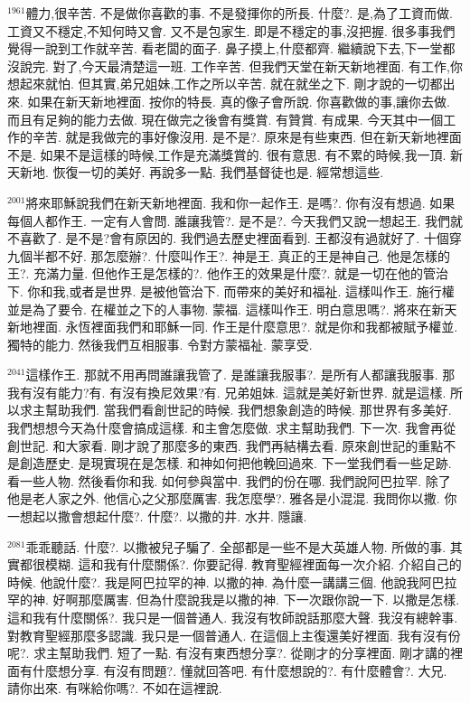 \documentclass{book}
\begin{document}
$^{1961}$體力,很辛苦.
不是做你喜歡的事.
不是發揮你的所長.
什麼?.
是,為了工資而做.
工資又不穩定,不知何時又會.
又不是包家生.
即是不穩定的事,沒把握.
很多事我們覺得一說到工作就辛苦.
看老闆的面子.
鼻子摸上,什麼都齊.
繼續說下去,下一堂都沒說完.
對了,今天最清楚這一班.
工作辛苦.
但我們天堂在新天新地裡面.
有工作,你想起來就怕.
但其實,弟兄姐妹,工作之所以辛苦.
就在就坐之下.
剛才說的一切都出來.
如果在新天新地裡面.
按你的特長.
真的像子會所說.
你喜歡做的事,讓你去做.
而且有足夠的能力去做.
現在做完之後會有獎賞.
有贊賞.
有成果.
今天其中一個工作的辛苦.
就是我做完的事好像沒用.
是不是?.
原來是有些東西.
但在新天新地裡面不是.
如果不是這樣的時候,工作是充滿獎賞的.
很有意思.
有不累的時候,我一頂.
新天新地.
恢復一切的美好.
再說多一點.
我們基督徒也是.
經常想這些.

$^{2001}$將來耶穌說我們在新天新地裡面.
我和你一起作王.
是嗎?.
你有沒有想過.
如果每個人都作王.
一定有人會問.
誰讓我管?.
是不是?.
今天我們又說一想起王.
我們就不喜歡了.
是不是?會有原因的.
我們過去歷史裡面看到.
王都沒有過就好了.
十個穿九個半都不好.
那怎麼辦?.
什麼叫作王?.
神是王.
真正的王是神自己.
他是怎樣的王?.
充滿力量.
但他作王是怎樣的?.
他作王的效果是什麼?.
就是一切在他的管治下.
你和我,或者是世界.
是被他管治下.
而帶來的美好和福祉.
這樣叫作王.
施行權並是為了要令.
在權並之下的人事物.
蒙福.
這樣叫作王.
明白意思嗎?.
將來在新天新地裡面.
永恆裡面我們和耶穌一同.
作王是什麼意思?.
就是你和我都被賦予權並.
獨特的能力.
然後我們互相服事.
令對方蒙福祉.
蒙享受.

$^{2041}$這樣作王.
那就不用再問誰讓我管了.
是誰讓我服事?.
是所有人都讓我服事.
那我有沒有能力?有.
有沒有換尼效果?有.
兄弟姐妹.
這就是美好新世界.
就是這樣.
所以求主幫助我們.
當我們看創世記的時候.
我們想象創造的時候.
那世界有多美好.
我們想想今天為什麼會搞成這樣.
和主會怎麼做.
求主幫助我們.
下一次.
我會再從創世記.
和大家看.
剛才說了那麼多的東西.
我們再結構去看.
原來創世記的重點不是創造歷史.
是現實現在是怎樣.
和神如何把他輓回過來.
下一堂我們看一些足跡.
看一些人物.
然後看你和我.
如何參與當中.
我們的份在哪.
我們說阿巴拉罕.
除了他是老人家之外.
他信心之父那麼厲害.
我怎麼學?.
雅各是小混混.
我問你以撒.
你一想起以撒會想起什麼?.
什麼?.
以撒的井.
水井.
隱讓.

$^{2081}$乖乖聽話.
什麼?.
以撒被兒子騙了.
全部都是一些不是大英雄人物.
所做的事.
其實都很模糊.
這和我有什麼關係?.
你要記得.
教育聖經裡面每一次介紹.
介紹自己的時候.
他說什麼?.
我是阿巴拉罕的神.
以撒的神.
為什麼一講講三個.
他說我阿巴拉罕的神.
好啊那麼厲害.
但為什麼說我是以撒的神.
下一次跟你說一下.
以撒是怎樣.
這和我有什麼關係?.
我只是一個普通人.
我沒有牧師說話那麼大聲.
我沒有總幹事.
對教育聖經那麼多認識.
我只是一個普通人.
在這個上主復還美好裡面.
我有沒有份呢?.
求主幫助我們.
短了一點.
有沒有東西想分享?.
從剛才的分享裡面.
剛才講的裡面有什麼想分享.
有沒有問題?.
懂就回答吧.
有什麼想說的?.
有什麼體會?.
大兄.
請你出來.
有咪給你嗎?.
不如在這裡說.
\end{document}
